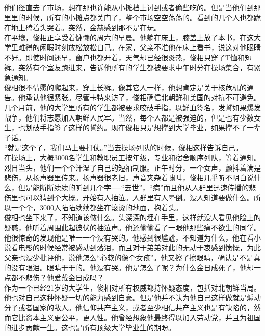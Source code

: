 \begin{multicols}{\theparacolNo}
他们径直去了市场，想在那也许能从小摊档上讨到或者偷些吃的。但是当他们到那里里的时候，所有的小摊点都关门了，整个市场空空荡荡的。看到的几个人也都跪在地上磕着头哭着。突然，金赫感到那不是在玩。\\

在平壤，俊相正享受着慵懒的周六的早晨。他躺在床上，膝盖上放了本书，在这大学里难得的闲暇时刻放松放松自己。在家，父亲不准他在床上看书，说这对他眼睛不好。即使时间还早，窗户也都开着，天气却已经很炎热，俊相只穿了T恤和短裤。突然有个室友跑进来，告诉他所有的学生都被要求中午时分在操场集合，有紧急通知。\\

俊相很不情愿的爬起来，穿上长裤。像其它人一样，他想肯定是关于核危机的通告。他承认他很紧张。尽管卡特来访了，俊相确信北朝鲜和美国的对抗不可避免。几个月前，他的大学里所有的学生都被要求咬破手指，以鲜血签名，发誓如果爆发战争，他们将志愿加入朝鲜人民军。当然，每个人都是被强迫的，但是也有少数女生，也划破手指签了这样的誓约。现在俊相只是想撑到大学毕业，如果撑不了一辈子话。\\

“就是这个了，我们马上要打仗。”当去操场列队的时候，俊相这样告诉自己。\\

在操场上，大概3000名学生和教职员工按年级，专业和宿舍顺序列队，等着通知。烈日当头，他们一个个汗湿了自己的短袖制服。正午时分，一个女声，颤抖着满是悲伤，从扬声器里传来。扬声器很老旧，声音夹杂着啸叫，俊相几乎听不明白说什么，但是能断断续续的听到几个字──“去世”，“病”而且他从人群里迅速传播的悲伤里也可以猜到个大概。开始有人抽泣。人群里有人晕倒。没人知道要做什么。所以一个个，3000人陆陆续续都坐在滚烫的地面，抱着头。\\

俊相也坐下来了，不知道该做什么。头深深的埋在手里，这样就没人看见他脸上的疑惑，他听着周围此起彼伏的抽泣声。他还偷偷看了一眼他那些痛不欲生的同学。他很惊奇的发现他是唯一一个没有哭的。他感到很尴尬，不知道为什么，他在看小说看电影的时候经常被感动到落泪，而且对于弟弟对此的无动于衷感到愤慨，为此父亲也没少批评他，说他怎么“心软的像个女孩”。他又擦了擦眼睛，确认是不是真的没有眼泪。眼睛干干的。他没有哭。他是怎么了呢？为什么金日成死了，他却一点都不悲伤？他爱戴金日成吗？\\

作为一个已经21岁的大学生，俊相对所有权威都持怀疑态度，包括对北朝鲜当局。他也对自己这种怀疑一切的能力感到自豪。但是他并不认为他自己这样做就是煽动分子或者国家的敌人。他信仰共产主义，或者至少相信共产主义也是有缺陷的，然而它比资本主义更公平，更人性。他曾经想象他最终得以加入劳动党，并且为祖国的进步贡献一生。这也是所有顶级大学毕业生的期盼。\\


\end{multicols}
